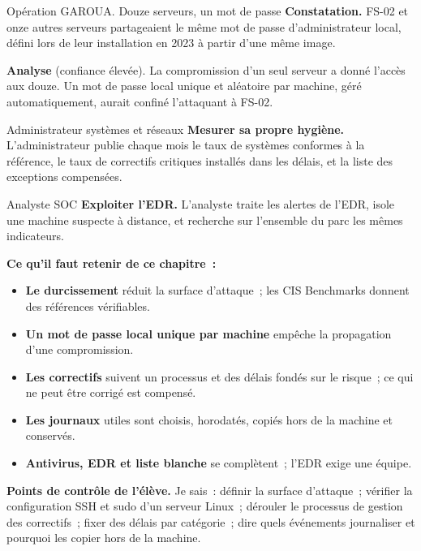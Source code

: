 \begin{boxscenario}{Opération GAROUA. Douze serveurs, un mot de passe}
\textbf{Constatation.} FS-02 et onze autres serveurs partageaient le même
mot de passe d'administrateur local, défini lors de leur installation en
2023 à partir d'une même image.

\medskip
\textbf{Analyse} (confiance élevée). La compromission d'un seul serveur a
donné l'accès aux douze. Un mot de passe local unique et aléatoire par
machine, géré automatiquement, aurait confiné l'attaquant à FS-02.
\end{boxscenario}

\begin{boxmetier}{Administrateur systèmes et réseaux}
\textbf{Mesurer sa propre hygiène.} L'administrateur publie chaque mois
le taux de systèmes conformes à la référence, le taux de correctifs
critiques installés dans les délais, et la liste des exceptions
compensées.
\end{boxmetier}

\begin{boxmetier}{Analyste SOC}
\textbf{Exploiter l'EDR.} L'analyste traite les alertes de l'EDR, isole
une machine suspecte à distance, et recherche sur l'ensemble du parc les
mêmes indicateurs.
\end{boxmetier}

\separateur

\begin{boxresume}
\textbf{Ce qu'il faut retenir de ce chapitre~:}
\begin{itemize}
    \item \textbf{Le durcissement} réduit la surface d'attaque~; les CIS
          Benchmarks donnent des références vérifiables.
    \item \textbf{Un mot de passe local unique par machine} empêche la
          propagation d'une compromission.
    \item \textbf{Les correctifs} suivent un processus et des délais
          fondés sur le risque~; ce qui ne peut être corrigé est compensé.
    \item \textbf{Les journaux} utiles sont choisis, horodatés, copiés hors
          de la machine et conservés.
    \item \textbf{Antivirus, EDR et liste blanche} se complètent~; l'EDR
          exige une équipe.
\end{itemize}
\end{boxresume}

\begin{boxinfo}
\textbf{Points de contrôle de l'élève.} Je sais~: définir la surface
d'attaque~; vérifier la configuration SSH et sudo d'un serveur Linux~;
dérouler le processus de gestion des correctifs~; fixer des délais par
catégorie~; dire quels événements journaliser et pourquoi les copier hors
de la machine.
\end{boxinfo}

